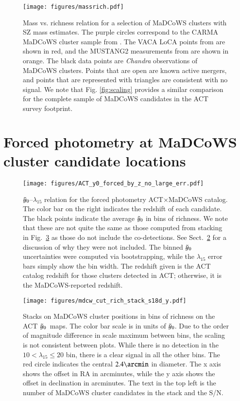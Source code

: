 \documentclass[longauth]{aa} %
\newcommand{\madcows}{MaDCoWS\xspace}
\newcommand{\yc}{$\Tilde{\vary}_0$\xspace}
\begin{document}
\begin{figure}[]
    \centering
    \texttt{[image: figures/massrich.pdf]}
    \caption{Mass vs. richness relation for a selection of MaDCoWS clusters with SZ mass estimates. The purple circles correspond to the CARMA MaDCoWS cluster sample from \citet{Gonzalez2019}. The VACA LoCA points from \citet{DiMascolo2020} are shown in red, and the MUSTANG2 measurements from \citet{Dicker2020} are shown in orange. The black data points are {\it Chandra} observations of \madcows clusters. Points that are open are known active mergers, and points that are represented with triangles are consistent with no signal. 
    We note that Fig. \ref{fig:scaling} provides a similar comparison for the complete sample of MaDCoWS candidates in the ACT survey footprint.
    } 
    \label{fig:massrich}
\end{figure}

\section{Forced photometry at MaDCoWS cluster candidate locations}\label{sec:photometry}

\begin{figure}
\centering 
\texttt{[image: figures/ACT\_y0\_forced\_by\_z\_no\_large\_err.pdf]}
\caption{ $\Tilde{\vary}_0$--$\lambda_{15}$ relation for the forced photometry ACT$\times$MaDCoWS catalog. 
The color bar on the right indicates the redshift of each candidate. The black points indicate the average \yc in bins of richness. We note that these are not quite the same as those computed from stacking in Fig.~\ref{fig:stacks} as those do not include the co-detections. See Sect.~\ref{fig:forced_photo} for a discussion of why they were not included. The binned \yc uncertainties were computed via bootstrapping, while the $\lambda_{15}$ error bars simply show the bin width. The redshift given is the ACT catalog redshift for those clusters detected in ACT; otherwise, it is the \madcows-reported redshift.}\label{fig:forced_photo}
\end{figure}

\begin{figure*}
\centering
\texttt{[image: figures/mdcw\_cut\_rich\_stack\_s18d\_y.pdf]}
\caption{Stacks on MaDCoWS cluster positions in bins of richness on the ACT \yc\ maps. The color bar scale is in units of \yc. Due to the order of magnitude difference in scale maximum between bins, the scaling is not consistent between plots. While there is no detection in the $10 < \lambda_{15} \leq 20$ bin, there is a clear signal in all the other bins. The red circle indicates the central $2.4\arcmin$ in diameter. The x axis shows the offset in RA in arcminutes, while the y axis shows the offset in declination in arcminutes. The text in the top left is the number of \madcows cluster candidates in the stack and the S/N.} \label{fig:stacks}
\end{figure*}
\end{document}
